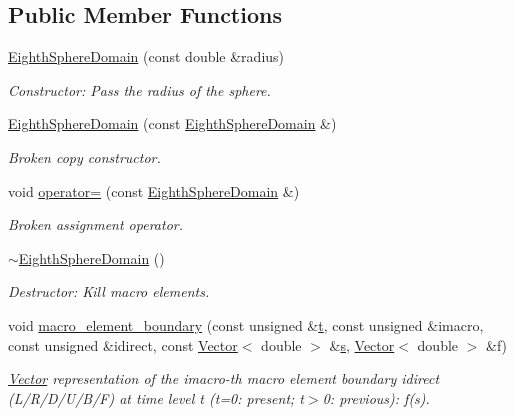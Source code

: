 \subsection*{Public Member Functions}
\begin{DoxyCompactItemize}
\item 
\hyperlink{classoomph_1_1EighthSphereDomain_a82c8a6b479e41bf07b9478e3d903b465}{Eighth\+Sphere\+Domain} (const double \&radius)
\begin{DoxyCompactList}\small\item\em Constructor\+: Pass the radius of the sphere. \end{DoxyCompactList}\item 
\hyperlink{classoomph_1_1EighthSphereDomain_af831fd06346e57808dca43940385e970}{Eighth\+Sphere\+Domain} (const \hyperlink{classoomph_1_1EighthSphereDomain}{Eighth\+Sphere\+Domain} \&)
\begin{DoxyCompactList}\small\item\em Broken copy constructor. \end{DoxyCompactList}\item 
void \hyperlink{classoomph_1_1EighthSphereDomain_a3533eb2f34986e995a779d2841267b12}{operator=} (const \hyperlink{classoomph_1_1EighthSphereDomain}{Eighth\+Sphere\+Domain} \&)
\begin{DoxyCompactList}\small\item\em Broken assignment operator. \end{DoxyCompactList}\item 
\hyperlink{classoomph_1_1EighthSphereDomain_ab299e8bd818573e3fca246973f1030b2}{$\sim$\+Eighth\+Sphere\+Domain} ()
\begin{DoxyCompactList}\small\item\em Destructor\+: Kill macro elements. \end{DoxyCompactList}\item 
void \hyperlink{classoomph_1_1EighthSphereDomain_a281727105819669ea9dab9fec120ea63}{macro\+\_\+element\+\_\+boundary} (const unsigned \&\hyperlink{cfortran_8h_af6f0bd3dc13317f895c91323c25c2b8f}{t}, const unsigned \&imacro, const unsigned \&idirect, const \hyperlink{classoomph_1_1Vector}{Vector}$<$ double $>$ \&\hyperlink{cfortran_8h_ab7123126e4885ef647dd9c6e3807a21c}{s}, \hyperlink{classoomph_1_1Vector}{Vector}$<$ double $>$ \&f)
\begin{DoxyCompactList}\small\item\em \hyperlink{classoomph_1_1Vector}{Vector} representation of the imacro-\/th macro element boundary idirect (L/\+R/\+D/\+U/\+B/F) at time level t (t=0\+: present; t$>$0\+: previous)\+: f(s). \end{DoxyCompactList}\end{DoxyCompactItemize}
